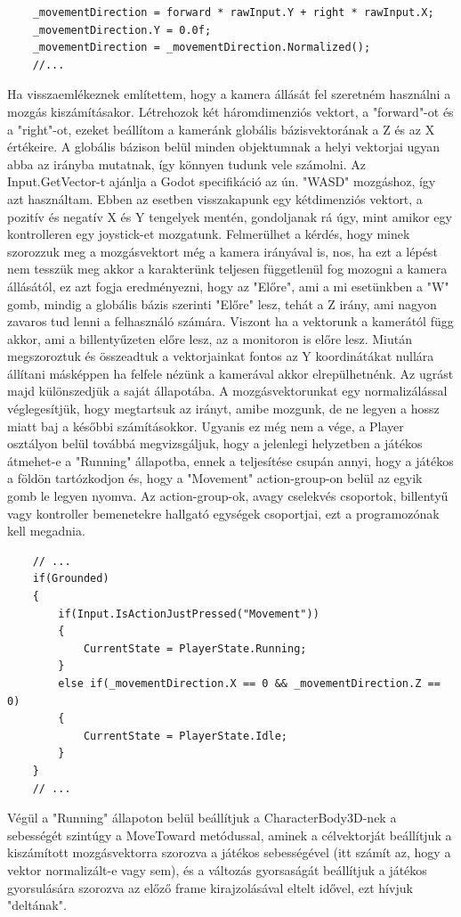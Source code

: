 \begin{itemize}
\begin{lstlisting}
	_movementDirection = forward * rawInput.Y + right * rawInput.X;
	_movementDirection.Y = 0.0f;
	_movementDirection = _movementDirection.Normalized();
	//...
	\end{lstlisting}
	Ha visszaemlékeznek említettem, hogy a kamera állását fel szeretném használni a mozgás kiszámításakor. Létrehozok két háromdimenziós vektort, a "forward"-ot és a "right"-ot, ezeket beállítom a kameránk globális bázisvektorának a Z és az X értékeire. A globális bázison belül minden objektumnak a helyi vektorjai ugyan abba az irányba mutatnak, így könnyen tudunk vele számolni. Az Input.GetVector-t ajánlja a Godot specifikáció az ún. "WASD" mozgáshoz, így azt használtam. Ebben az esetben visszakapunk egy kétdimenziós vektort, a pozitív és negatív X és Y tengelyek mentén, gondoljanak rá úgy, mint amikor egy kontrolleren egy joystick-et mozgatunk. Felmerülhet a kérdés, hogy minek szorozzuk meg a mozgásvektort még a kamera irányával is, nos, ha ezt a lépést nem tesszük meg akkor a karakterünk teljesen függetlenül fog mozogni a kamera állásától, ez azt fogja eredményezni, hogy az "Előre", ami a mi esetünkben a "W" gomb, mindig a globális bázis szerinti "Előre" lesz, tehát a Z irány, ami nagyon zavaros tud lenni a felhasználó számára. Viszont ha a vektorunk a kamerától függ akkor, ami a billentyűzeten előre lesz, az a monitoron is előre lesz. Miután megszoroztuk és összeadtuk a vektorjainkat fontos az Y koordinátákat nullára állítani másképpen ha felfele nézünk a kamerával akkor elrepülhetnénk. Az ugrást majd különszedjük a saját állapotába. A mozgásvektorunkat egy normalizálással véglegesítjük, hogy megtartsuk az irányt, amibe mozgunk, de ne legyen a hossz miatt baj a későbbi számításokkor. Ugyanis ez még nem a vége, a Player osztályon belül továbbá megvizsgáljuk, hogy a jelenlegi helyzetben a játékos átmehet-e a "Running" állapotba, ennek a teljesítése csupán annyi, hogy a játékos a földön tartózkodjon és, hogy a "Movement" action-group-on belül az egyik gomb le legyen nyomva. Az action-group-ok, avagy cselekvés csoportok, billentyű vagy kontroller bemenetekre hallgató egységek csoportjai, ezt a programozónak kell megadnia. 
	\lstset{style=sharpc}
	\begin{lstlisting}
	// ...	
	if(Grounded)
	{
		if(Input.IsActionJustPressed("Movement"))
		{
			CurrentState = PlayerState.Running;
		}
		else if(_movementDirection.X == 0 && _movementDirection.Z == 0)
		{
			CurrentState = PlayerState.Idle;
		}
	}
	// ...
	\end{lstlisting}
Végül a "Running" állapoton belül beállítjuk a CharacterBody3D-nek a sebességét szintúgy a MoveToward metódussal, aminek a célvektorját beállítjuk a kiszámított mozgásvektorra szorozva a játékos sebességével (itt számít az, hogy a vektor normalizált-e vagy sem), és a változás gyorsaságát beállítjuk a játékos gyorsulására szorozva az előző frame kirajzolásával eltelt idővel, ezt hívjuk "deltának".

\end{itemize}

